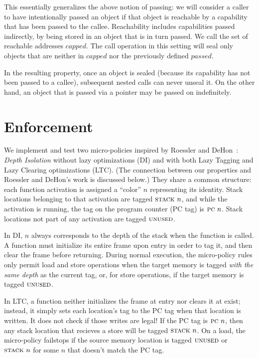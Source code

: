 \documentclass[10pt,conference]{ieeetran}%
\theoremstyle{definition}
\begin{document}
This essentially generalizes the above notion of passing: we will consider
a caller to have intentionally passed an object if that object is reachable by
a capability that has been passed to the callee. Reachability includes capabilities passed
indirectly, by being stored in an object that is in turn passed. We call
the set of reachable addresses \(\mathit{capped}\). The call operation in this setting
will seal only objects that are neither in \(\mathit{capped}\) nor the previously defined \(\mathit{passed}\).

In the resulting property, once an object is sealed (because its
capability has not been passed to a callee), subsequent nested calls can never unseal it.
On the other hand, an object that is passed via a pointer may be passed on indefinitely.

\section{Enforcement}
\label{sec:enforcement}

We implement and test two micro-policies inspired by
Roessler and DeHon~\cite{DBLP:conf/sp/RoesslerD18}:
{\em Depth Isolation} without lazy optimizations (DI) and with both
Lazy Tagging and Lazy Clearing optimizations (LTC).
(The connection between our properties and Roessler and DeHon's work is discussed below.)
They share a common structure: each function activation is assigned a ``color'' \(n\)
representing its identity. Stack locations belonging to that activation are
tagged \(\textsc{stack} ~ n\), and while the activation is running, the tag on the
program counter (PC tag) is \(\textsc{pc} ~ n\). Stack locations not part of
any activation are tagged \(\textsc{unused}\).

In DI, \(n\) always corresponds to the depth of the stack when
the function is called. A function must initialize its entire frame upon entry
in order to tag it, and then clear the frame before returning.
During normal execution, the micro-policy rules only permit load and
store operations when the target memory is tagged {\em with the same depth}
as the current {\PCname} tag, or, for store operations, if the target memory
is tagged \(\textsc{unused}\).

In LTC, a function neither initializes the frame at entry nor clears it at exist;
instead, it simply sets each location's tag to the PC tag when that location is written. It does
not check if those writes are legal! If the PC tag is \(\textsc{pc} ~ n\),
then any stack location that recieves a store will be tagged \(\textsc{stack} ~ n\).
On a load, the micro-policy failstops if the source memory location
is tagged \(\textsc{unused}\) or \(\textsc{stack} ~ n\) for some \(n\) that
doesn't match the PC tag.
\end{document}
